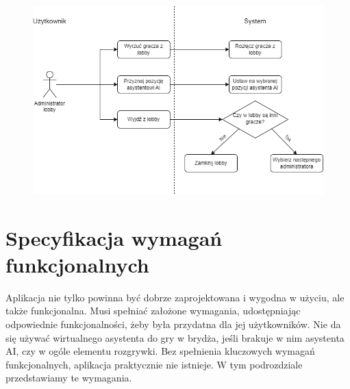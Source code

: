\begin{figure}[h]
  \centering
  \includegraphics[width=\textwidth]{img/schematy/manage_lobby.png}
  \caption{}
\end{figure}

\FloatBarrier






\section{Specyfikacja wymagań funkcjonalnych}
Aplikacja nie tylko powinna być dobrze zaprojektowana i wygodna w użyciu, ale także funkcjonalna. Musi spełniać założone wymagania, udostępniając odpowiednie funkcjonalności, żeby była przydatna dla jej użytkowników. Nie da się używać wirtualnego asystenta do gry w brydża, jeśli brakuje w nim asystenta AI, czy w ogóle elementu rozgrywki. Bez spełnienia kluczowych wymagań funkcjonalnych, aplikacja praktycznie nie istnieje. W tym podrozdziale przedstawiamy te wymagania.
